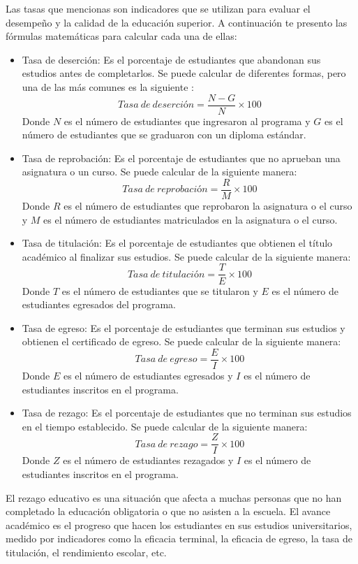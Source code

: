\documentclass{article}
\begin{document}
Las tasas que mencionas son indicadores que se utilizan para evaluar el desempeño y la calidad de la educación superior. A continuación te presento las fórmulas matemáticas para calcular cada una de ellas:
\begin{itemize}
    \item Tasa de deserción: Es el porcentaje de estudiantes que abandonan sus estudios antes de completarlos. Se puede calcular de diferentes formas, pero una de las más comunes es la siguiente \cite{fuente2, fuente3}:
    \[ Tasa\ de\ deserción = \frac{N - G}{N} \times 100 \]
    Donde $N$ es el número de estudiantes que ingresaron al programa y $G$ es el número de estudiantes que se graduaron con un diploma estándar.
    
    \item Tasa de reprobación: Es el porcentaje de estudiantes que no aprueban una asignatura o un curso. Se puede calcular de la siguiente manera:
    \[ Tasa\ de\ reprobación = \frac{R}{M} \times 100 \]
    Donde $R$ es el número de estudiantes que reprobaron la asignatura o el curso y $M$ es el número de estudiantes matriculados en la asignatura o el curso.
    
    \item Tasa de titulación: Es el porcentaje de estudiantes que obtienen el título académico al finalizar sus estudios. Se puede calcular de la siguiente manera:
    \[ Tasa\ de\ titulación = \frac{T}{E} \times 100 \]
    Donde $T$ es el número de estudiantes que se titularon y $E$ es el número de estudiantes egresados del programa.
    
    \item Tasa de egreso: Es el porcentaje de estudiantes que terminan sus estudios y obtienen el certificado de egreso. Se puede calcular de la siguiente manera:
    \[ Tasa\ de\ egreso = \frac{E}{I} \times 100 \]
    Donde $E$ es el número de estudiantes egresados y $I$ es el número de estudiantes inscritos en el programa.
    
    \item Tasa de rezago: Es el porcentaje de estudiantes que no terminan sus estudios en el tiempo establecido. Se puede calcular de la siguiente manera:
    \[ Tasa\ de\ rezago = \frac{Z}{I} \times 100 \]
    Donde $Z$ es el número de estudiantes rezagados y $I$ es el número de estudiantes inscritos en el programa.
\end{itemize}

El rezago educativo es una situación que afecta a muchas personas que no han completado la educación obligatoria o que no asisten a la escuela. El avance académico es el progreso que hacen los estudiantes en sus estudios universitarios, medido por indicadores como la eficacia terminal, la eficacia de egreso, la tasa de titulación, el rendimiento escolar, etc.
\end{document}
